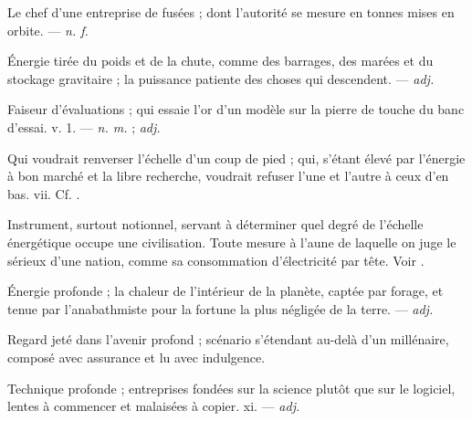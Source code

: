  Le chef d'une entreprise de fusées ; dont l'autorité se mesure en tonnes mises en orbite.  ---  \textit{n. f.}

 Énergie tirée du poids et de la chute, comme des barrages, des marées et du stockage gravitaire ; la puissance patiente des choses qui descendent. ---  \textit{adj.}

 Faiseur d'évaluations ; qui essaie l'or d'un modèle sur la pierre de touche du banc d'essai.   v. 1. ---  \textit{n. m.} ;  \textit{adj.}

 Qui voudrait renverser l'échelle d'un coup de pied ; qui, s'étant élevé par l'énergie à bon marché et la libre recherche, voudrait refuser l'une et l'autre à ceux d'en bas.   vii. Cf. .

  Instrument, surtout notionnel, servant à déterminer quel degré de l'échelle énergétique occupe une civilisation.   Toute mesure à l'aune de laquelle on juge le sérieux d'une nation, comme sa consommation d'électricité par tête.  Voir .

 Énergie profonde ; la chaleur de l'intérieur de la planète, captée par forage, et tenue par l'anabathmiste pour la fortune la plus négligée de la terre. ---  \textit{adj.}

 Regard jeté dans l'avenir profond ; scénario s'étendant au-delà d'un millénaire, composé avec assurance et lu avec indulgence.

 Technique profonde ; entreprises fondées sur la science plutôt que sur le logiciel, lentes à commencer et malaisées à copier.   xi. ---  \textit{adj.}

